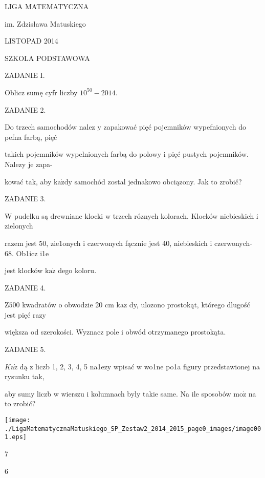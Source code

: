 \documentclass[a4paper,12pt]{article}
\begin{document}
LIGA MATEMATYCZNA

im. Zdzisława Matuskiego

LISTOPAD 2014

SZKOLA PODSTAWOWA

ZADANIE I.

Oblicz sumę cyfr liczby $10^{50}-2014.$

ZADANIE 2.

Do trzech samochodów nalez $\mathrm{y}$ zapakować pięć pojemników wypefnionych do pefna farbą, pięć

takich pojemników wypelnionych farbą do polowy i pięć pustych pojemników. Nalezy je zapa-

kować tak, aby $\mathrm{k}\mathrm{a}\dot{\mathrm{z}}\mathrm{d}\mathrm{y}$ samochód zostal jednakowo obciązony. Jak to zrobič?

ZADANIE 3.

$\mathrm{W}$ pudelku są drewniane klocki w trzech róznych kolorach. Klocków niebieskich i zielonych

razem jest 50, zie1onych i czerwonych fącznie jest 40, niebieskich i czerwonych- 68. Ob1icz i1e

jest klocków $\mathrm{k}\mathrm{a}\dot{\mathrm{z}}$ dego koloru.

ZADANIE 4.

$\mathrm{Z}500$ kwadratów o obwodzie 20 cm $\mathrm{k}\mathrm{a}\dot{\mathrm{z}}$ dy, ulozono prostokąt, którego dlugość jest pięć razy

większa od szerokości. Wyznacz pole i obwód otrzymanego prostokąta.

ZADANIE 5.

$K\mathrm{a}\dot{\mathrm{z}}$ dą z liczb 1, 2, 3, 4, 5 na1ezy wpisać w wo1ne po1a figury przedstawionej na rysunku tak,

aby sumy liczb w wierszu i kolumnach byly takie same. Na ile sposobów $\mathrm{m}\mathrm{o}\dot{\mathrm{z}}$ na to zrobić?
\begin{center}
\texttt{[image: ./LigaMatematycznaMatuskiego\_SP\_Zestaw2\_2014\_2015\_page0\_images/image001.eps]}
\end{center}
7

6
\end{document}
